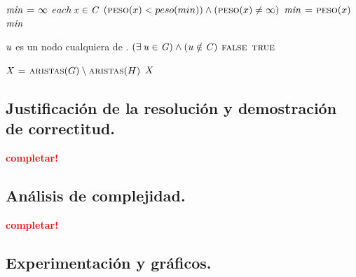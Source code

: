 \vspace*{0.3cm}


\begin{codebox}
\li $\id{min} \gets \infty$
\li \For $each \hspace{0.07cm} \id{x} \in \id{C}$
\li     \Do
            \If $(\textnormal{\scshape peso}(x) < {peso}(min)) \land (\textnormal{\scshape peso}(x) \neq \infty)$
\li             \Then
                    $\id{min} \gets \proc{peso}(x)$
                \End
        \End
\li \Return $\id{min}$
\end{codebox}


\vspace*{0.3cm}


\begin{codebox}
\li \Comment $\id{u}$ es un nodo cualquiera de .
\li \If $(\exists \hspace{0.07cm} \id{u} \in \id{G}) \land (\id{u} \notin \id{C})$
\li     \Then
            \Return $\textnormal{\scshape false}$
        \End
\li \Return $\textnormal{\scshape true}$
\end{codebox}


\vspace*{0.3cm}


\begin{codebox}
\li $\id{X} \gets \proc{aristas}(G) \setminus \proc{aristas}(H)$
\li \Return $\id{X}$
\end{codebox}



\newpage
\subsection{Justificación de la resolución y demostración de correctitud.}

\vspace*{0.3cm}

\textcolor{red}{\textbf{completar!}}



\newpage
\subsection{Análisis de complejidad.}

\vspace*{0.3cm}

\textcolor{red}{\textbf{completar!}}



\newpage
\subsection{Experimentación y gráficos.}

